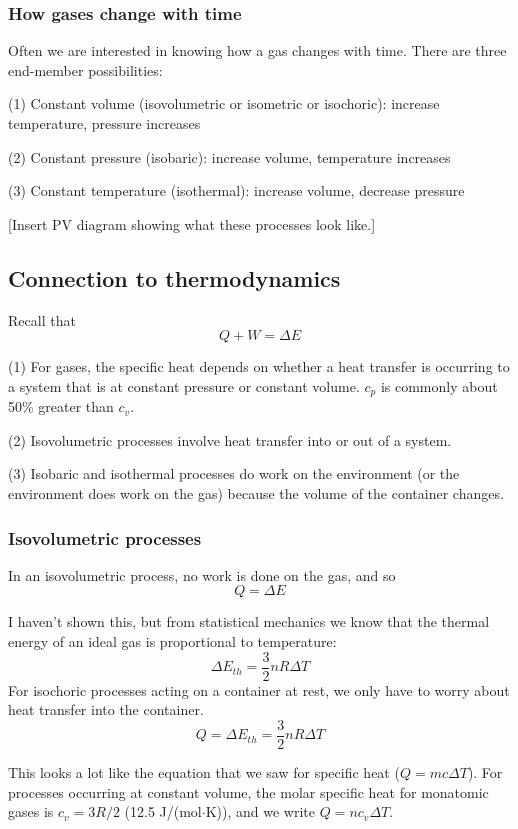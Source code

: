 \subsubsection{How gases change with time}
Often we are interested in knowing how a gas changes with time. There are three end-member possibilities:

(1) Constant volume (isovolumetric or isometric or isochoric): increase temperature, pressure increases

(2) Constant pressure (isobaric): increase volume, temperature increases

(3) Constant temperature (isothermal): increase volume, decrease pressure


[Insert PV diagram showing what these processes look like.]\nopagebreak
\vspace{5cm}


\subsection{Connection to thermodynamics}
Recall that
$$Q+W=\Delta E$$

(1) For gases, the specific heat depends on whether a heat transfer is occurring to a system that is at constant pressure or constant volume. $c_p$ is commonly about 50\% greater than $c_v$.

(2) Isovolumetric processes involve heat transfer into or out of a system.

(3) Isobaric and isothermal processes do work on the environment (or the environment does work on the gas) because the volume of the container changes.


\subsubsection{Isovolumetric processes}
In an isovolumetric process, no work is done on the gas, and so
$$Q=\Delta E$$

I haven't shown this, but from statistical mechanics we know that the thermal energy of an ideal gas is proportional to temperature:
$$\Delta{E_{th}}=\frac{3}{2}nR\Delta T$$
For isochoric processes acting on a container at rest, we only have to worry about heat transfer into the container.
$$Q=\Delta{E_{th}}=\frac{3}{2}nR\Delta T$$

This looks a lot like the equation that we saw for specific heat ($Q=mc\Delta{T}$). For processes occurring at constant volume, the molar specific heat for monatomic gases is $c_v=3R/2$ (12.5 J/(mol$\cdot$K)), and we write $Q=nc_v\Delta{T}$.

